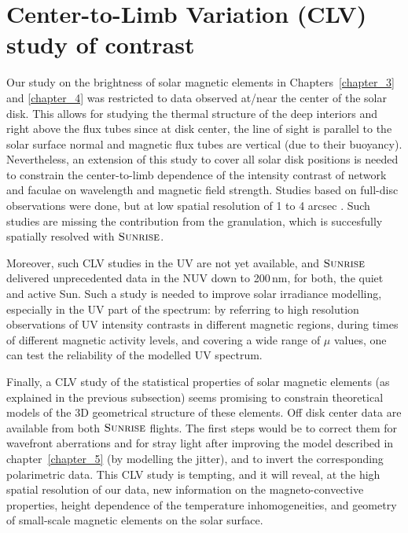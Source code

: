 \documentclass[goettingen, gauss, print]{thesis}
\begin{document}
\section{Center-to-Limb Variation (CLV) study of contrast}
Our study on the brightness of solar magnetic elements in Chapters~\ref{chapter_3} and \ref{chapter_4} was restricted to data observed at/near the center of the solar disk. This allows for studying the thermal structure of the deep interiors and right above the flux tubes since at disk center, the line of sight is parallel to the solar surface normal and magnetic flux tubes are vertical (due to their buoyancy). 
Nevertheless, an extension of this study to cover all solar disk positions is needed to constrain the center-to-limb dependence of the intensity contrast of network and faculae on wavelength and magnetic field strength. Studies based on full-disc observations were done, but at low spatial resolution of 1 to 4 arcsec  \citep{ortiz_intensity_2002, yeo_intensity_2013}. Such studies are missing the contribution from the granulation, which is succesfully spatially resolved with $\textsc{Sunrise}$.%

Moreover, such CLV studies in the UV are not yet available, and $\textsc{Sunrise}$ delivered unprecedented data in the NUV down to 200\,nm, for both, the quiet and active Sun. Such a study is needed to improve solar irradiance modelling, especially in the UV part of the spectrum: by referring to high resolution observations of UV intensity contrasts in different magnetic regions, during times of different magnetic activity levels, and covering a wide range of $\mu$ values, one can test the reliability of the modelled UV spectrum. 

Finally, a CLV study of the statistical properties of solar magnetic elements (as explained in the previous subsection) seems promising to constrain theoretical models of the 3D geometrical structure of these elements. Off disk center data are available from both $\textsc{Sunrise}$ flights. The first steps would be to correct them for wavefront aberrations and for stray light after improving the model described in chapter~\ref{chapter_5} (by modelling the jitter), and to invert the corresponding polarimetric data. This CLV study is tempting, and it will reveal, at the high spatial resolution of our data, new information on the magneto-convective properties, height dependence of the temperature inhomogeneities, and geometry of small-scale magnetic elements on the solar surface.
\end{document}
